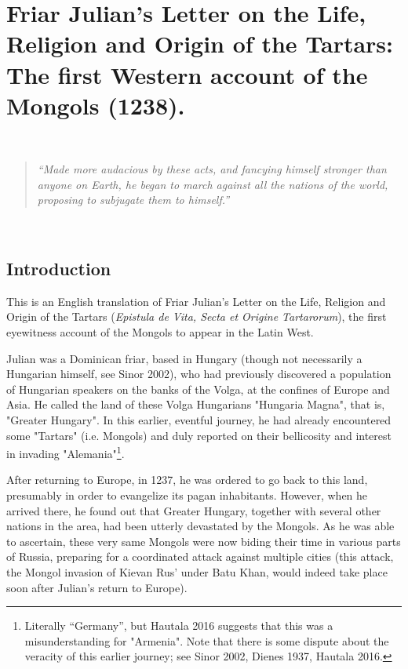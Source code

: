 \section{Friar Julian's Letter on the Life, Religion and Origin of the Tartars: The first Western account of the Mongols (1238).}


{\ }

\begin{quote}
\emph{``Made more audacious by these acts, and fancying himself stronger than anyone on Earth, he began to march against all the nations of the world, proposing to subjugate them to himself.''}
\end{quote}

{\ }


\subsection{Introduction}


This is an English translation of Friar Julian's Letter on the Life, 
Religion and Origin of the Tartars (\emph{Epistula de Vita, Secta et Origine Tartarorum}), the first eyewitness account of the Mongols to appear in the Latin West.

Julian was a Dominican friar, based in Hungary (though not necessarily a Hungarian himself, see Sinor 2002), who had previously discovered a population of Hungarian speakers on the banks of the Volga, at the confines of Europe and Asia. He called the land of these Volga Hungarians "Hungaria Magna", that is, "Greater Hungary". In this earlier, eventful journey, he had already encountered some "Tartars" (i.e. Mongols) and duly reported on their bellicosity and interest in invading "Alemania"\footnote{Literally ``Germany'', but Hautala 2016 suggests that this was a misunderstanding for "Armenia". Note that there is some dispute about the veracity of this earlier journey; see Sinor 2002, Dienes 1937, Hautala 2016.}. 

After returning to Europe, in 1237, he was ordered to go back to this land, presumably in order to evangelize its pagan inhabitants. However, when he arrived there, he found out that Greater Hungary, together with several other nations in the area, had been utterly devastated by the Mongols. As he was able to ascertain, these very same Mongols were now biding their time in various parts of Russia, preparing for a coordinated attack against multiple cities (this attack, the Mongol invasion of Kievan Rus' under Batu Khan, would indeed take place soon after Julian's return to Europe). 

